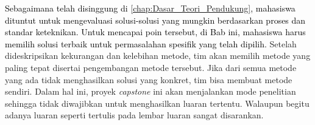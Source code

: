 \textcolor{black}{Sebagaimana telah disinggung di \ref{chap:Dasar_Teori_Pendukung}, mahasiswa dituntut untuk mengevaluasi solusi-solusi yang mungkin berdasarkan proses dan standar keteknikan. Untuk mencapai poin tersebut, di Bab ini, mahasiswa harus memilih solusi terbaik untuk permasalahan spesifik yang telah dipilih.} Setelah dideskripsikan kekurangan dan kelebihan metode, tim akan memilih metode yang paling tepat disertai pengembangan metode tersebut. Jika dari semua metode yang ada tidak menghasilkan solusi yang konkret, tim bisa membuat metode sendiri. Dalam hal ini, proyek \textit{capstone} ini akan menjalankan mode penelitian sehingga tidak diwajibkan untuk menghasilkan luaran tertentu. Walaupun begitu adanya luaran seperti tertulis pada lembar luaran sangat disarankan. 

